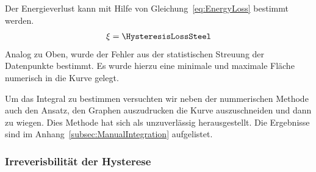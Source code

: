 \documentclass[a4paper,10pt,twocolumn]{article}
\begin{document}
    Der Energieverlust kann mit Hilfe von Gleichung~\eqref{eq:EnergyLoss} bestimmt werden.
    \begin{align*}
        \xi = \HysteresisLossSteel
    \end{align*}
    Analog zu Oben, wurde der Fehler aus der statistischen Streuung der Datenpunkte bestimmt.
    Es wurde hierzu eine minimale und maximale Fläche numerisch in die Kurve gelegt.
    
    Um das Integral zu bestimmen versuchten wir neben der nummerischen Methode auch den Ansatz, den Graphen auszudrucken
    die Kurve auszuschneiden und dann zu wiegen.
    Dies Methode hat sich als unzuverlässig herausgestellt.
    Die Ergebnisse sind im Anhang~\ref{subsec:ManualIntegration} aufgelistet.
    
    \subsubsection{Irreverisbilität der Hysterese}
    
    
%    
    
\end{document}
